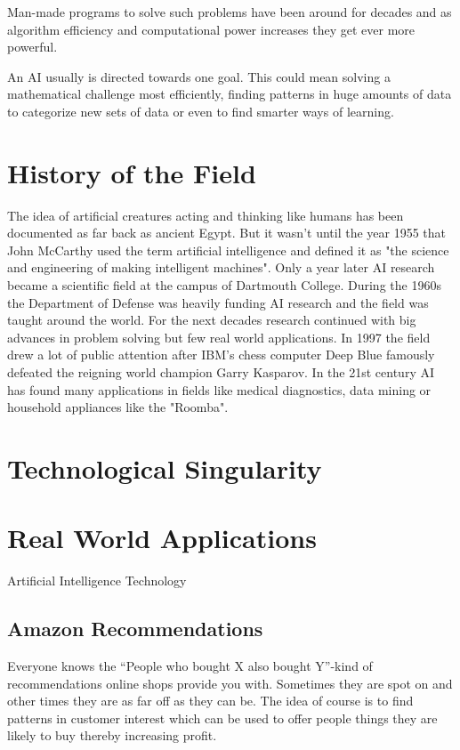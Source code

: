 Man-made programs to solve such problems have been around for decades and as algorithm efficiency and computational power increases they get ever more powerful.

An AI usually is directed towards one goal. This could mean solving a mathematical challenge most efficiently, finding patterns in huge amounts of data to categorize new sets of data or even to find smarter ways of learning.


\section{History of the Field}

The idea of artificial creatures acting and thinking like humans has been documented as far back as ancient Egypt. But it wasn't until the year 1955 that John McCarthy used the term artificial intelligence and defined it as "the science and engineering of making intelligent machines".
Only a year later AI research became a scientific field at the campus of Dartmouth College. During the 1960s the Department of Defense was heavily funding AI research and the field was taught around the world.
For the next decades research continued with big advances in problem solving but few real world applications. In 1997 the field drew a lot of public attention after IBM's chess computer Deep Blue famously defeated the reigning world champion Garry Kasparov.
In the 21st century AI has found many applications in fields like medical diagnostics, data mining or household appliances like the "Roomba". 

\section{Technological Singularity}

\newpage
\section{Real World Applications}

Artificial Intelligence Technology 

\subsection{Amazon Recommendations}
Everyone knows the ``People who bought X also bought Y''-kind of recommendations online shops provide you with. Sometimes they are spot on and other times they are as far off as they can be. The idea of course is to find patterns in customer interest which can be used to offer people things they are likely to buy thereby increasing profit.

